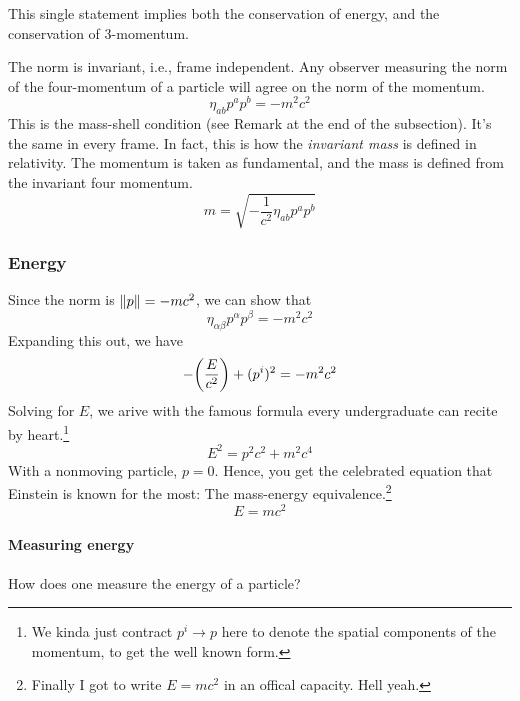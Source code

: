 			This single statement implies both the conservation of energy,
			and the conservation of 3-momentum.
			

			The norm is invariant, i.e., frame independent. Any 
			observer measuring the norm of the four-momentum of a particle
			will agree on the norm of the momentum. 
			\[
				\eta_{ab} p^a p^b = -m^2 c^2
			\]
			This is the mass-shell condition (see Remark at the end of the subsection).
			It's the same in every frame. In fact, this is
			how the \textit{invariant mass} is defined in relativity. The momentum is taken as fundamental, and the mass is 
			defined from the invariant four momentum.
			\[
				m = \sqrt{-\frac{1}{c^2} \eta_{ab} p^a p^b}
			\]
			
	\subsubsection{Energy}
	Since the norm is $\norm{p} = -mc^2$, we can show that
			\[
				\eta_{\alpha\beta} p^\alpha p^\beta = - m^2c^2
			\]
			Expanding this out, we have
			\[
				-\pqty{\frac{E}{c^2}} + (p^i)^2 = -m^2c^2
			\]
			Solving for $E$, we arive with the famous formula
			every undergraduate can recite by heart.\footnote{We kinda just contract $p^i\to p$ here to denote the spatial components of the momentum, to get the well known form.}
			\begin{equation}
				\label{eq:energy-momentum relation}
				E^2 = p^2 c^2 + m^2 c^4
			\end{equation}
			With a nonmoving particle, $p=0$. Hence, you get
			the celebrated equation that Einstein is known for the most: The mass-energy equivalence.\footnote{Finally I got to write $E=mc^2$ in an offical capacity. Hell yeah.}
			\begin{equation}
				\label{eq:mass-energy-equivalence}
			    E = mc^2
			\end{equation}

			\paragraph{Measuring energy}
			
			How does one measure the energy of a particle?

